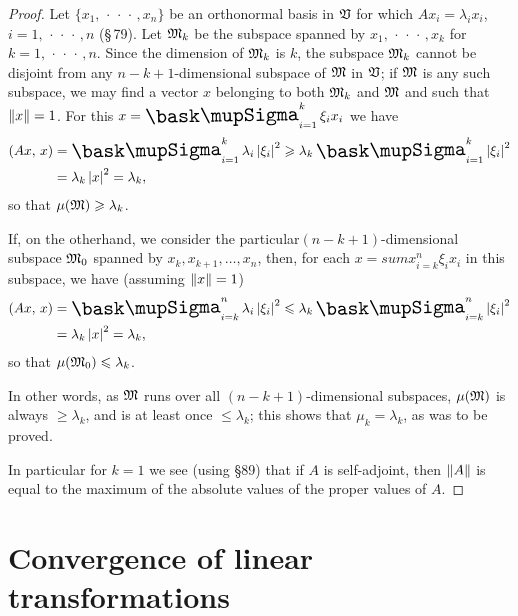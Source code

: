 \begin{proof}
    Let \(\{x_1, \,\cdot\,\cdot\,\cdot\,, x_n\}\) be an orthonormal basis in
    \(\mathfrak{V}\) for which \(Ax_i = \lambda_i x_i\), \(i = 1,
    \,\cdot\,\cdot\,\cdot\,, n\) (\S\,79). Let \(\mathfrak{M}_k\) be the subspace
    spanned by \(x_1, \,\cdot\,\cdot\,\cdot\,, x_k\) for \(k = 1,
    \,\cdot\,\cdot\,\cdot\,, n\). Since the dimension of \(\mathfrak{M}_k\) is \(k\),
    the subspace \(\mathfrak{M}_k\) cannot be disjoint from any \(n-k+1\)-dimensional
    subspace of \(\mathfrak{M}\) in \(\mathfrak{V}\); if \(\mathfrak{M}\) is any such subspace, we
    may find a vector \(x\) belonging to both \(\mathfrak{M}_k\) and \(\mathfrak{M}\) and
    such that \(\left\lVert x\right\rVert = 1\). For this \(x = \sumx_{i=1}^k \xi_i x_i\) we have
    \begin{align*}
        \innerprod{Ax}{x} &= \sumx_{i=1}^k \lambda_i \abs{\xi_i}^2 \geq \lambda_k \sumx_{i=1}^k \abs{\xi_i}^2\\
        &= \lambda_k \abs{x}^2 = \lambda_k,
    \end{align*}
    so that \(\mu(\mathfrak{M}) \geqslant \lambda_k\).

    If, on the otherhand, we consider the particular\( (n - k + 1)\)-dimensional
    subspace \(\mathfrak{M}_0\) spanned by \(x_k, x_{k+1}, \ldots, x_n\), then, for
    each \(x = sumx_{i=k}^n \xi_i x_i\) in this subspace, we have (assuming
    \(\left\lVert x\right\rVert = 1\))
    \begin{align*}
        \innerprod{Ax}{x} &= \sumx_{i=k}^n \lambda_i \abs{\xi_i}^2 \leq \lambda_k \sumx_{i=k}^n \abs{\xi_i}^2\\
        &= \lambda_k \abs{x}^2 = \lambda_k,
    \end{align*}
    so that \(\mu(\mathfrak{M}_0) \leqslant \lambda_k\).

    In other words, as \(\mathfrak{M}\) runs over all \((n - k + 1)\)-dimensional
    subspaces, \(\mu(\mathfrak{M})\) is always \(\geq \lambda_k\), and is at least
    once \(\leq \lambda_k\); this shows that \(\mu_k = \lambda_k\), as was to be
    proved.

    In particular for \(k =1\) we see (using §89) that if \(A\) is self-adjoint,
    then \(\left\lVert A\right\rVert\) is equal to the maximum of the absolute values of the
    proper values of \(A\).
\end{proof}

\section{Convergence of linear transformations}


